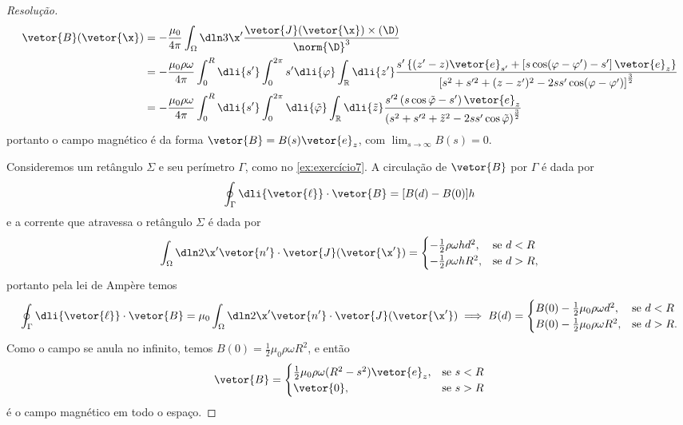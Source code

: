 \begin{proof}[Resolução]
    \begin{align*}
        \vetor{B}(\vetor{\x})
        &=-\frac{\mu_0}{4\pi} \int_{\Omega} \dln3{\x'} \frac{\vetor{J}(\vetor{\x})\times (\D)}{\norm{\D}^3} \\
        &=-\frac{\mu_0 \rho \omega}{4\pi} \int_{0}^R \dli{s'} \int_{0}^{2\pi} s' \dli{\varphi} \int_{\mathbb{R}} \dli{z'} \frac{s'\left\{(z' - z) \vetor{e}_{s'} + \left[s \cos(\varphi - \varphi') - s'\right]\vetor{e}_z\right\}}{\left[s^2 + s'^2 + (z - z')^2 - 2s s' \cos(\varphi - \varphi')\right]^{\frac32}}\\
        &=-\frac{\mu_0 \rho \omega}{4\pi} \int_0^R\dli{s'}\int_0^{2\pi} \dli{\tilde{\varphi}}\int_{\mathbb{R}}\dli{\tilde{z}} \frac{s'^2\left(s \cos\tilde{\varphi} - s'\right)\vetor{e}_z}{\left(s^2 + s'^2 + \tilde{z}^2 - 2s s' \cos\tilde{\varphi}\right)^{\frac32}}
    \end{align*}
    portanto o campo magnético é da forma \(\vetor{B} = B(s) \vetor{e}_z\), com \(\displaystyle\lim_{s \to \infty}{B(s)} = 0\).

    Consideremos um retângulo \(\Sigma\) e seu perímetro \(\Gamma\), como no \cref{ex:exercício7}. A circulação de \(\vetor{B}\) por \(\Gamma\) é dada por
    \begin{equation*}
        \oint_{\Gamma}\dli{\vetor{\ell}}\cdot\vetor{B} = [B(d) - B(0)]h
    \end{equation*}
    e a corrente que atravessa o retângulo \(\Sigma\) é dada por
    \begin{equation*}
        \int_{\Omega} \dln2{\x'} \vetor{n'}\cdot \vetor{J}(\vetor{\x'}) = \begin{cases}
            -\frac12\rho \omega h d^2,&\text{se }d < R\\
            -\frac12 \rho \omega h R^2,&\text{se }d > R,
        \end{cases}
    \end{equation*}
    portanto pela lei de Ampère temos
    \begin{equation*}
        \oint_{\Gamma}\dli{\vetor{\ell}}\cdot\vetor{B} =\mu_0 \int_{\Omega} \dln2{\x'} \vetor{n'}\cdot \vetor{J}(\vetor{\x'})  \implies B(d) = \begin{cases}
            B(0)-\frac12\mu_0\rho \omega  d^2,&\text{se }d < R\\
            B(0)-\frac12\mu_0\rho \omega  R^2,&\text{se }d > R.
        \end{cases}
    \end{equation*}
    Como o campo se anula no infinito, temos \(B(0) = \frac12 \mu_0 \rho \omega R^2\), e então
    \begin{equation*}
        \vetor{B} = \begin{cases}
            \frac12 \mu_0 \rho \omega (R^2 - s^2)\vetor{e}_z,&\text{se }s < R\\
            \vetor{0},&\text{se }s > R
        \end{cases}
    \end{equation*}
    é o campo magnético em todo o espaço.


\end{proof}

